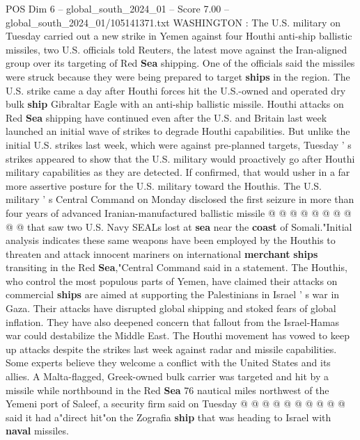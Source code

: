 \begin{textsample}{POS Dim 6 – global\_south\_2024\_01 – Score 7.00 – global\_south\_2024\_01/105141371.txt}  \label{ex:f6_pos_093}
WASHINGTON : The U.S. military on Tuesday carried out a new strike in Yemen against four Houthi anti-ship ballistic missiles, two U.S. officials told Reuters, the latest move against the Iran-aligned group over its targeting of Red \textbf{Sea} shipping.
One of the officials said the missiles were struck because they were being prepared to target \textbf{ships} in the region.
The U.S. strike came a day after Houthi forces hit the U.S.-owned and operated dry bulk \textbf{ship} Gibraltar Eagle with an anti-ship ballistic missile.
Houthi attacks on Red \textbf{Sea} shipping have continued even after the U.S. and Britain last week launched an initial wave of strikes to degrade Houthi capabilities.
But unlike the initial U.S. strikes last week, which were against pre-planned targets, Tuesday ' s strikes appeared to show that the U.S. military would proactively go after Houthi military capabilities as they are detected.
If confirmed, that would usher in a far more assertive posture for the U.S. military toward the Houthis.
The U.S. military ' s Central Command on Monday disclosed the first seizure in more than four years of advanced Iranian-manufactured ballistic missile @ @ @ @ @ @ @ @ @ @ that saw two U.S.
Navy SEALs lost at \textbf{sea} near the \textbf{coast} of Somali."Initial analysis indicates these same weapons have been employed by the Houthis to threaten and attack innocent mariners on international \textbf{merchant} \textbf{ships} transiting in the Red \textbf{Sea},"Central Command said in a statement.
The Houthis, who control the most populous parts of Yemen, have claimed their attacks on commercial \textbf{ships} are aimed at supporting the Palestinians in Israel ' s war in Gaza.
Their attacks have disrupted global shipping and stoked fears of global inflation.
They have also deepened concern that fallout from the Israel-Hamas war could destabilize the Middle East.
The Houthi movement has vowed to keep up attacks despite the strikes last week against radar and missile capabilities.
Some experts believe they welcome a conflict with the United States and its allies.
A Malta-flagged, Greek-owned bulk carrier was targeted and hit by a missile while northbound in the Red \textbf{Sea} 76 nautical miles northwest of the Yemeni port of Saleef, a security firm said on Tuesday @ @ @ @ @ @ @ @ @ @ said it had a"direct hit"on the Zografia \textbf{ship} that was heading to Israel with \textbf{naval} missiles.

\end{textsample}
